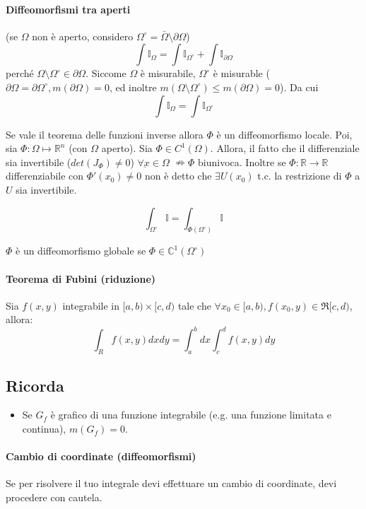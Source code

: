 \documentclass[a4paper,12pt]{article}
\begin{document}
\paragraph{Diffeomorfismi tra aperti}
(se $\Omega$ non è aperto, considero $\Omega^\circ = \bar{\Omega}\setminus\partial\Omega$)\\
$$\int \mathbb{I}_\Omega = \int \mathbb{I}_{\Omega^\circ} + \int \mathbb{I}_{\partial\Omega}$$
perché $\Omega\setminus\Omega^\circ \in \partial\Omega$. Siccome $\Omega$ è misurabile, $\Omega^\circ$ è misurable ($\partial\Omega = \partial\Omega^\circ, m(\partial\Omega) = 0$, ed inoltre $m(\Omega\setminus\Omega^\circ) \leq m(\partial\Omega) = 0$).
Da cui
$$\int \mathbb{I}_\Omega = \int \mathbb{I}_{\Omega^\circ} $$

Se vale il teorema delle funzioni inverse allora $\Phi$ è un diffeomorfismo locale.
Poi, sia $\Phi: \Omega \mapsto \mathbb{R}^n$ (con $\Omega$ aperto). Sia $\Phi \in C^1(\Omega)$. Allora, il fatto che il differenziale sia invertibile ($det(J_\Phi) \neq 0$) $\forall \underbar{x} \in \Omega$ $\nRightarrow \Phi$ biunivoca. Inoltre se $\Phi: \mathbb{R}\rightarrow \mathbb{R}$ differenziabile con $\Phi '(x_0) \neq 0$ non è detto che $\exists U(x_0)$ t.c. la restrizione di $\Phi$ a $U$ sia invertibile.

$$\int_{\Omega^\circ} \mathbb{I} = \int_{\Phi(\Omega^\circ)} \mathbb{I} $$

$\Phi$ è un diffeomorfismo globale se $\Phi \in \mathbb{C}^1(\Omega^\circ)$

\paragraph{Teorema di Fubini (riduzione)}
Sia $f(x, y)$ integrabile in $[a, b)\times[c,d)$ tale che $\forall x_0 \in [a,b), f(x_0, y) \in \Re[c,d)$, allora:
$$\int_R f(x, y)dxdy = \int^b_a dx\int^d_c f(x, y) dy$$

\subsection{Ricorda}
\begin{itemize}
 \item Se $G_f$ è grafico di una funzione integrabile (e.g. una funzione limitata e continua), $m(G_f) = 0$.
\end{itemize}
\paragraph{Cambio di coordinate (diffeomorfismi)}
Se per risolvere il tuo integrale devi effettuare un cambio di coordinate, devi procedere con cautela.
\end{document}
